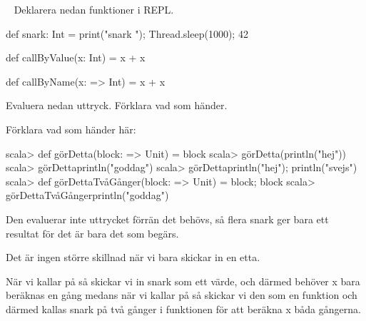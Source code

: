 \QUESTEND





\QUESTBEGIN

\Task  \what~  Deklarera nedan funktioner i REPL.

\begin{Code}
def snark: Int = { print("snark "); Thread.sleep(1000); 42 }

def callByValue(x: Int) = x + x

def callByName(x: => Int) = x + x
\end{Code}

Evaluera nedan uttryck. Förklara vad som händer.

\Subtask {}

\Subtask {}

\Subtask {}

\Subtask {}

\Subtask {}

\Subtask {}


\Subtask Förklara vad som händer här:
\begin{REPL}
scala> def görDetta(block: => Unit) = block
scala> görDetta(println("hej"))
scala> görDetta{println("goddag")}
scala> görDetta{println("hej"); println("svejs")}
scala> def görDettaTvåGånger(block: => Unit) = {block; block}
scala> görDettaTvåGånger{println("goddag")}
\end{REPL}


\SOLUTION


\TaskSolved \what


\SubtaskSolved  {}

\SubtaskSolved  {}

Den evaluerar inte uttrycket förrän det behövs, så flera snark ger bara ett resultat för det är bara det som begärs.

\SubtaskSolved  {}

\SubtaskSolved  {}

Det är ingen större skillnad när vi bara skickar in en etta.

\SubtaskSolved  {}

\SubtaskSolved  När vi kallar på  så skickar vi in snark som ett värde, och därmed behöver x bara beräknas en gång medans när vi kallar på  så skickar vi den som en funktion och därmed kallas snark på två gånger i funktionen för att beräkna x båda gångerna.


